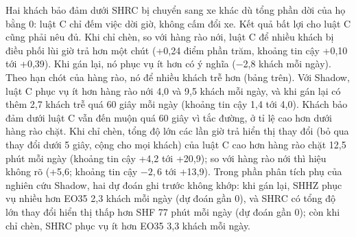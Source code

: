 Hai khách bảo đảm dưới SHRC bị chuyển sang xe khác dù tổng phần dời của họ bằng 0: luật C chỉ đếm việc dời giờ, không
cấm đổi xe. Kết quả bất lợi cho luật C cũng phải nêu đủ. Khi chỉ chèn, so với hàng rào nới, luật C để nhiều khách bị điều
phối lùi giờ trả hơn một chút (+0,24 điểm phần trăm, khoảng tin cậy +0,10 tới +0,39). Khi gán lại, nó phục vụ ít hơn có ý
nghĩa (−2,8 khách mỗi ngày). Theo hạn chót của hàng rào, nó để nhiều khách trễ hơn (bảng trên). Với Shadow, luật C phục vụ
ít hơn hàng rào nới 4,0 và 9,5 khách mỗi ngày, và khi gán lại có thêm 2,7 khách trễ quá 60 giây mỗi ngày (khoảng tin cậy
1,4 tới 4,0). Khách bảo đảm dưới luật C vẫn đến muộn quá 60 giây vì tắc đường, ở tỉ lệ cao hơn dưới hàng rào chặt. Khi chỉ
chèn, tổng độ lớn các lần giờ trả hiển thị thay đổi (bỏ qua thay đổi dưới 5 giây, cộng cho mọi khách) của luật C cao hơn hàng
rào chặt 12,5 phút mỗi ngày (khoảng tin cậy +4,2 tới +20,9); so với hàng rào nới thì hiệu không rõ (+5,6; khoảng tin cậy
$-2{,}6$ tới +13,9). Trong phần phân tích phụ của nghiên cứu Shadow, hai dự đoán ghi trước không khớp: khi gán lại, SHHZ
phục vụ nhiều hơn EO35 2,3 khách mỗi ngày (dự đoán gần 0), và SHRC có tổng độ lớn thay đổi hiển thị thấp hơn SHF 77 phút mỗi
ngày (dự đoán gần 0); còn khi chỉ chèn, SHRC phục vụ ít hơn EO35 3,3 khách mỗi ngày.

